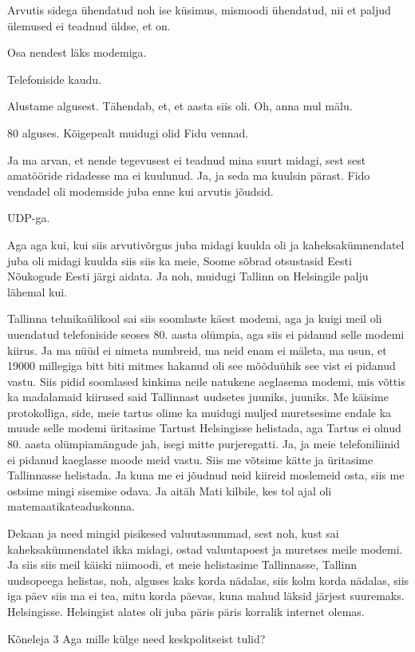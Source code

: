 Arvutis sidega ühendatud noh ise küsimus, mismoodi ühendatud, nii et paljud ülemused ei teadnud üldse, et on. 

Osa nendest läks modemiga. 

Telefoniside kaudu. 

Alustame algusest. Tähendab, et, et aasta siis oli. Oh, anna mul mälu. 

80 alguses. Kõigepealt muidugi olid Fidu vennad. 

Ja ma arvan, et nende tegevusest ei teadnud mina suurt midagi, sest sest amatööride ridadesse ma ei kuulunud. Ja, ja seda ma kuulsin pärast. Fido vendadel oli modemside juba enne kui arvutis jõudsid. 

UDP-ga. 

Aga aga kui, kui siis arvutivõrgus juba midagi kuulda oli ja kaheksakümnendatel juba oli midagi kuulda siis siis ka meie, Soome sõbrad otsustasid Eesti Nõukogude Eesti järgi aidata. Ja noh, muidugi Tallinn on Helsingile palju lähemal kui. 

Tallinna tehnikaülikool sai siis soomlaste käest modemi, aga ja kuigi meil oli uuendatud telefoniside seoses 80. aasta olümpia, aga siis ei pidanud selle modemi kiirus. Ja ma nüüd ei nimeta numbreid, ma neid enam ei mäleta, ma usun, et 19000 millegiga bitt biti mitmes hakanud oli see mõõduühik see vist ei pidanud vastu. Siis pidid soomlased kinkima neile natukene aeglasema modemi, mis võttis ka madalamaid kiirused said Tallinnast uudsetes juuniks, juuniks. Me käisime protokolliga, side, meie tartus olime ka muidugi muljed muretsesime endale ka muude selle modemi üritasime Tartust Helsingisse helistada, aga Tartus ei olnud 80. aasta olümpiamängude jah, isegi mitte purjeregatti. Ja, ja meie telefoniliinid ei pidanud kaeglasse moode meid vastu. Siis me võtsime kätte ja üritasime Tallinnasse helistada. Ja kuna me ei jõudnud neid kiireid moslemeid osta, siis me ostsime mingi sisemise odava. Ja aitäh Mati kilbile, kes tol ajal oli matemaatikateaduskonna. 

Dekaan ja need mingid pisikesed valuutasummad, sest noh, kust sai kaheksakümnendatel ikka midagi, ostad valuutapoest ja muretses meile modemi. Ja siis siis meil käiski niimoodi, et meie helistasime Tallinnasse, Tallinn uudsopeega helistas, noh, alguses kaks korda nädalas, siis kolm korda nädalas, siis iga päev siis ma ei tea, mitu korda päevas, kuna mahud läksid järjest suuremaks. Helsingisse. Helsingist alates oli juba päris päris korralik internet olemas. 

Kõneleja 3
Aga mille külge need keskpolitseist tulid? 

